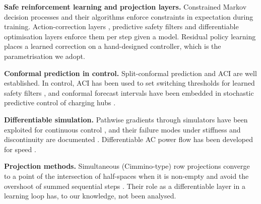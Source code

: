 \documentclass[11pt]{article}
\begin{document}
\textbf{Safe reinforcement learning and projection layers.} Constrained Markov decision processes and their algorithms \cite{garcia,achiam} enforce constraints in expectation during training. Action-correction layers \cite{dalal}, predictive safety filters \cite{wabersich} and differentiable optimisation layers \cite{optnet,cvxpylayers} enforce them per step given a model. Residual policy learning \cite{johannink,silverres} places a learned correction on a hand-designed controller, which is the parametrisation we adopt.

\textbf{Conformal prediction in control.} Split-conformal prediction \cite{vovk,lei,angelopoulos} and ACI \cite{aci} are well established. In control, ACI has been used to set switching thresholds for learned safety filters \cite{acofi}, and conformal forecast intervals have been embedded in stochastic predictive control of charging hubs \cite{zapico}.

\textbf{Differentiable simulation.} Pathwise gradients through simulators have been exploited for continuous control \cite{heess,shac,brax,difftaichi}, and their failure modes under stiffness and discontinuity are documented \cite{suh,metz}. Differentiable AC power flow has been developed for speed \cite{dpf}.

\textbf{Projection methods.} Simultaneous (Cimmino-type) row projections converge to a point of the intersection of half-spaces when it is non-empty and avoid the overshoot of summed sequential steps \cite{cimmino,censor}. Their role as a differentiable layer in a learning loop has, to our knowledge, not been analysed.

\end{document}
